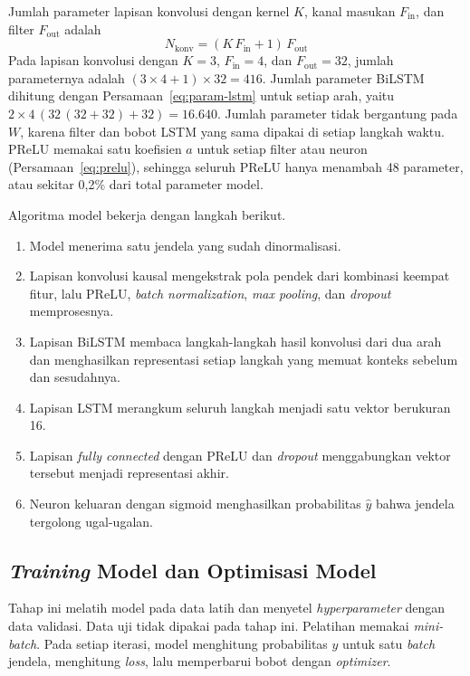 Jumlah parameter lapisan konvolusi dengan kernel $K$, kanal masukan $F_{\mathrm{in}}$, dan filter $F_{\mathrm{out}}$ adalah
\begin{equation}
  N_{\mathrm{konv}} = (K\,F_{\mathrm{in}} + 1)\,F_{\mathrm{out}}
  \label{eq:met-param}
\end{equation}
Pada lapisan konvolusi dengan $K = 3$, $F_{\mathrm{in}} = 4$, dan $F_{\mathrm{out}} = 32$, jumlah parameternya adalah $(3 \times 4 + 1) \times 32 = 416$. Jumlah parameter BiLSTM dihitung dengan Persamaan~\ref{eq:param-lstm} untuk setiap arah, yaitu $2 \times 4\,(32\,(32 + 32) + 32) = 16.640$. Jumlah parameter tidak bergantung pada $W$, karena filter dan bobot LSTM yang sama dipakai di setiap langkah waktu. PReLU memakai satu koefisien $a$ untuk setiap filter atau neuron (Persamaan~\ref{eq:prelu}), sehingga seluruh PReLU hanya menambah 48 parameter, atau sekitar 0,2\% dari total parameter model.

Algoritma model bekerja dengan langkah berikut.
\begin{enumerate}
  \item Model menerima satu jendela yang sudah dinormalisasi.
  \item Lapisan konvolusi kausal mengekstrak pola pendek dari kombinasi keempat fitur, lalu PReLU, \textit{batch normalization}, \textit{max pooling}, dan \textit{dropout} memprosesnya.
  \item Lapisan BiLSTM membaca langkah-langkah hasil konvolusi dari dua arah dan menghasilkan representasi setiap langkah yang memuat konteks sebelum dan sesudahnya.
  \item Lapisan LSTM merangkum seluruh langkah menjadi satu vektor berukuran 16.
  \item Lapisan \textit{fully connected} dengan PReLU dan \textit{dropout} menggabungkan vektor tersebut menjadi representasi akhir.
  \item Neuron keluaran dengan sigmoid menghasilkan probabilitas $\hat{y}$ bahwa jendela tergolong ugal-ugalan.
\end{enumerate}

\subsection{\textit{Training} Model dan Optimisasi Model}
Tahap ini melatih model pada data latih dan menyetel \textit{hyperparameter} dengan data validasi. Data uji tidak dipakai pada tahap ini. Pelatihan memakai \textit{mini-batch}. Pada setiap iterasi, model menghitung probabilitas $\hat{y}$ untuk satu \textit{batch} jendela, menghitung \textit{loss}, lalu memperbarui bobot dengan \textit{optimizer}.

